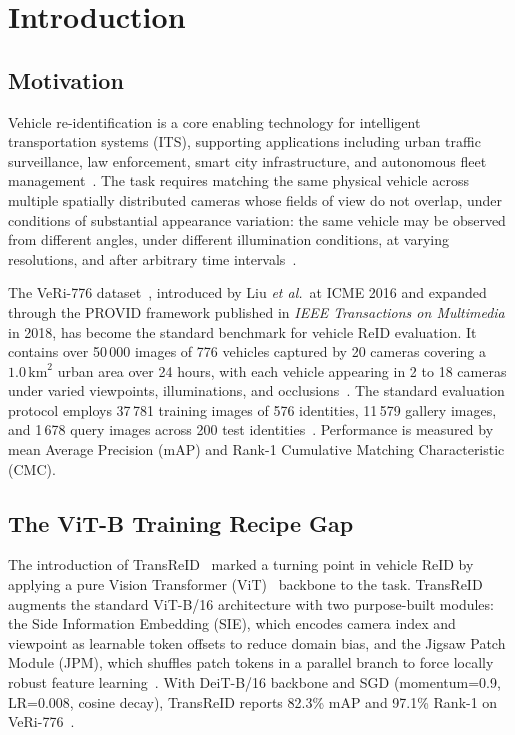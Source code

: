 \documentclass[11pt]{article}
\begin{document}
\section{Introduction}
\label{sec:intro}

\subsection{Motivation}
Vehicle re-identification is a core enabling technology for intelligent
transportation systems (ITS), supporting applications including urban traffic
surveillance, law enforcement, smart city infrastructure, and autonomous fleet
management~\cite{liu2016veri,liu2018provid}. The task requires matching the
same physical vehicle across multiple spatially distributed cameras whose
fields of view do not overlap, under conditions of substantial appearance
variation: the same vehicle may be observed from different angles, under
different illumination conditions, at varying resolutions, and after arbitrary
time intervals~\cite{liu2016veri}.

The VeRi-776 dataset~\cite{liu2016veri,liu2018provid}, introduced by Liu
\emph{et al.}\ at ICME 2016 and expanded through the PROVID framework
published in \emph{IEEE Transactions on Multimedia} in 2018, has become the
standard benchmark for vehicle ReID evaluation. It contains over 50\,000
images of 776 vehicles captured by 20 cameras covering a
$1.0\,\text{km}^{2}$ urban area over 24 hours, with each vehicle appearing in
2 to 18 cameras under varied viewpoints, illuminations, and
occlusions~\cite{liu2016veri,liu2018provid}. The standard evaluation protocol
employs 37\,781 training images of 576 identities, 11\,579 gallery images, and
1\,678 query images across 200 test identities~\cite{liu2018provid}.
Performance is measured by mean Average Precision (mAP) and Rank-1
Cumulative Matching Characteristic (CMC).

\subsection{The ViT-B Training Recipe Gap}
The introduction of TransReID~\cite{he2021transreid} marked a turning point in
vehicle ReID by applying a pure Vision Transformer
(ViT)~\cite{dosovitskiy2021vit} backbone to the task. TransReID augments the
standard ViT-B/16 architecture with two purpose-built modules: the Side
Information Embedding (SIE), which encodes camera index and viewpoint as
learnable token offsets to reduce domain bias, and the Jigsaw Patch Module
(JPM), which shuffles patch tokens in a parallel branch to force locally
robust feature learning~\cite{he2021transreid}. With DeiT-B/16 backbone and
SGD (momentum=0.9, LR=0.008, cosine decay), TransReID reports 82.3\% mAP and
97.1\% Rank-1 on VeRi-776~\cite{he2021transreid}.
\end{document}

